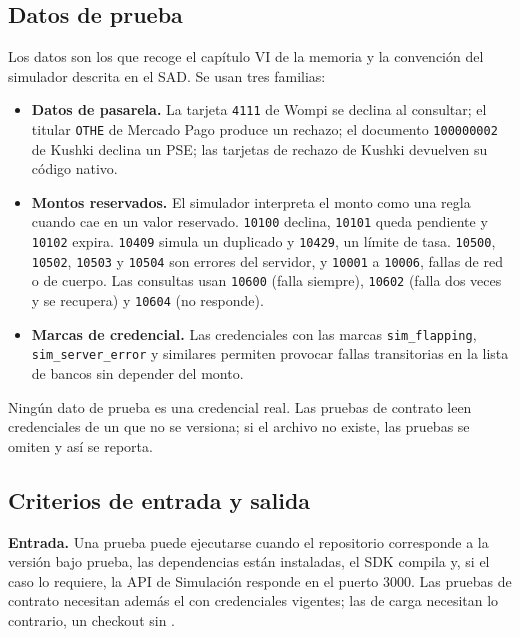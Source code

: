 \subsection{Datos de prueba}

Los datos son los que recoge el capítulo VI de la memoria y la convención del simulador descrita en el SAD. Se usan tres familias:

\begin{itemize}
  \item \textbf{Datos de pasarela.} La tarjeta \texttt{4111} de Wompi se declina al consultar; el titular \texttt{OTHE} de Mercado Pago produce un rechazo; el documento \texttt{100000002} de Kushki declina un PSE; las tarjetas de rechazo de Kushki devuelven su código nativo.
  \item \textbf{Montos reservados.} El simulador interpreta el monto como una regla cuando cae en un valor reservado. \texttt{10100} declina, \texttt{10101} queda pendiente y \texttt{10102} expira. \texttt{10409} simula un duplicado y \texttt{10429}, un límite de tasa. \texttt{10500}, \texttt{10502}, \texttt{10503} y \texttt{10504} son errores del servidor, y \texttt{10001} a \texttt{10006}, fallas de red o de cuerpo. Las consultas usan \texttt{10600} (falla siempre), \texttt{10602} (falla dos veces y se recupera) y \texttt{10604} (no responde).
  \item \textbf{Marcas de credencial.} Las credenciales con las marcas \texttt{sim\_flapping}, \texttt{sim\_server\_error} y similares permiten provocar fallas transitorias en la lista de bancos sin depender del monto.
\end{itemize}

Ningún dato de prueba es una credencial real. Las pruebas de contrato leen credenciales de un  que no se versiona; si el archivo no existe, las pruebas se omiten y así se reporta.

\subsection{Criterios de entrada y salida}

\textbf{Entrada.} Una prueba puede ejecutarse cuando el repositorio corresponde a la versión bajo prueba, las dependencias están instaladas, el SDK compila y, si el caso lo requiere, la API de Simulación responde en el puerto 3000. Las pruebas de contrato necesitan además el  con credenciales vigentes; las de carga necesitan lo contrario, un checkout sin .

